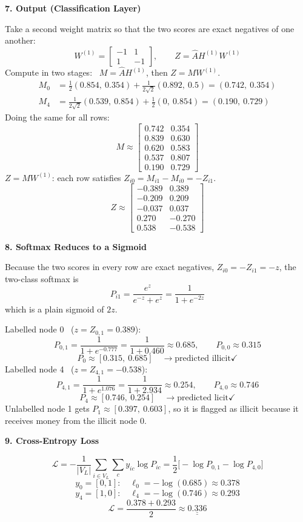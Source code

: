 \documentclass[12pt,a4paper]{article}
\newcommand{\Ahat}{\hat A}
\newcommand{\h}[1]{\par\medskip\textbf{\large #1}\par}
\begin{document}
\h{7. Output (Classification Layer)}
Take a second weight matrix so that the two scores are exact negatives of one another:
\[
  W^{(1)} = \begin{bmatrix} -1 & 1\\ 1 & -1 \end{bmatrix}, \qquad Z = \Ahat H^{(1)} W^{(1)}
\]
Compute in two stages: \ $M = \Ahat H^{(1)}$, then $Z = M W^{(1)}$.
\begin{align*}
  M_0 &= \tfrac12(0.854,\ 0.354) + \tfrac{1}{2\sqrt2}(0.892,\ 0.5) = (0.742,\ 0.354)\\
  M_4 &= \tfrac{1}{2\sqrt2}(0.539,\ 0.854) + \tfrac12(0,\ 0.854) = (0.190,\ 0.729)
\end{align*}
Doing the same for all rows:
\[
  M \approx \begin{bmatrix}
  0.742 & 0.354\\ 0.839 & 0.630\\ 0.620 & 0.583\\ 0.537 & 0.807\\ 0.190 & 0.729
  \end{bmatrix}
\]
$Z = M W^{(1)}$: each row satisfies $Z_{i0} = M_{i1} - M_{i0} = -Z_{i1}$.
\[
  Z \approx \begin{bmatrix}
  -0.389 & 0.389\\ -0.209 & 0.209\\ -0.037 & 0.037\\ 0.270 & -0.270\\ 0.538 & -0.538
  \end{bmatrix}
\]

\h{8. Softmax Reduces to a Sigmoid}
Because the two scores in every row are exact negatives, $Z_{i0} = -Z_{i1} = -z$, the two-class softmax is
\[
  P_{i1} = \frac{e^{z}}{e^{-z} + e^{z}} = \frac{1}{1 + e^{-2z}}
\]
which is a plain sigmoid of $2z$.

Labelled node 0 \ ($z = Z_{0,1} = 0.389$):
\[
  P_{0,1} = \frac{1}{1 + e^{-0.777}} = \frac{1}{1 + 0.460} \approx 0.685, \qquad P_{0,0} \approx 0.315
\]
\[
  P_0 \approx [0.315,\ 0.685] \quad \rightarrow \text{predicted illicit} \checkmark
\]
Labelled node 4 \ ($z = Z_{4,1} = -0.538$):
\[
  P_{4,1} = \frac{1}{1 + e^{1.076}} = \frac{1}{1 + 2.934} \approx 0.254, \qquad P_{4,0} \approx 0.746
\]
\[
  P_4 \approx [0.746,\ 0.254] \quad \rightarrow \text{predicted licit} \checkmark
\]
Unlabelled node 1 gets $P_1 \approx [0.397,\ 0.603]$, so it is flagged as illicit because it receives money from the illicit node 0.

\h{9. Cross-Entropy Loss}
\[
  \mathcal L = -\frac{1}{|V_L|}\sum_{i\in V_L}\sum_{c} y_{ic}\log P_{ic} = \frac12\big[-\log P_{0,1} - \log P_{4,0}\big]
\]
\[
  y_0 = [0, 1]: \quad \ell_0 = -\log(0.685) \approx 0.378
\]
\[
  y_4 = [1, 0]: \quad \ell_4 = -\log(0.746) \approx 0.293
\]
\[
  \mathcal L = \frac{0.378 + 0.293}{2} \approx \underline{\underline{0.336}}
\]
\end{document}
